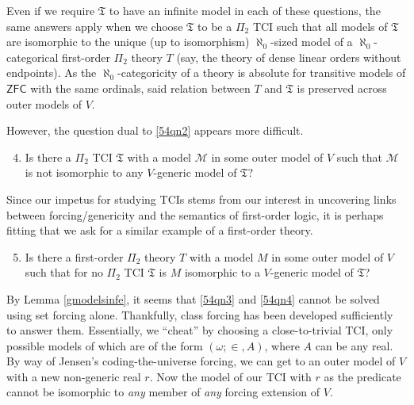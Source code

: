 \documentclass[12pt, twoside]{memoir}
\numberwithin{equation}{section}
\theoremstyle{definition}
\theoremstyle{remark}
\theoremstyle{definition}
\theoremstyle{definition}
\theoremstyle{definition}
\theoremstyle{remark}
\begin{document}
Even if we require $\mathfrak{T}$ to have an infinite model in each of these questions, the same answers apply when we choose $\mathfrak{T}$ to be a $\Pi_2$ TCI such that all models of $\mathfrak{T}$ are isomorphic to the unique (up to isomorphism) $\aleph_0$-sized model of a $\aleph_0$-categorical first-order $\Pi_2$ theory $T$ (say, the theory of dense linear orders without endpoints). As the $\aleph_0$-categoricity of a theory is absolute for transitive models of $\mathsf{ZFC}$ with the same ordinals, said relation between $T$ and $\mathfrak{T}$ is preserved across outer models of $V$.

However, the question dual to \ref{54qn2} appears more difficult.

\begin{enumerate}[label=(Q\arabic*)]
    \setcounter{enumi}{3}
    \item\label{54qn3} Is there a $\Pi_2$ TCI $\mathfrak{T}$ with a model $\mathcal{M}$ in some outer model of $V$ such that $\mathcal{M}$ is not isomorphic to any $V$-generic model of $\mathfrak{T}$?
\end{enumerate}

Since our impetus for studying TCIs stems from our interest in uncovering links between forcing/genericity and the semantics of first-order logic, it is perhaps fitting that we ask for a similar example of a first-order theory. 

\begin{enumerate}[label=(Q\arabic*)]
    \setcounter{enumi}{4}
    \item\label{54qn4} Is there a first-order $\Pi_2$ theory $T$ with a model $M$ in some outer model of $V$ such that for no $\Pi_2$ TCI $\mathfrak{T}$ is $M$ isomorphic to a $V$-generic model of $\mathfrak{T}$?
\end{enumerate}

By Lemma \ref{gmodelsinfe}, it seems that \ref{54qn3} and \ref{54qn4} cannot be solved using set forcing alone. Thankfully, class forcing has been developed sufficiently to answer them. Essentially, we ``cheat'' by choosing a close-to-trivial TCI, only possible models of which are of the form $(\omega; \in, A)$, where $A$ can be any real. By way of Jensen's coding-the-universe forcing, we can get to an outer model of $V$ with a new non-generic real $r$. Now the model of our TCI with $r$ as the predicate cannot be isomorphic to \emph{any} member of \emph{any} forcing extension of $V$. 
\end{document}
